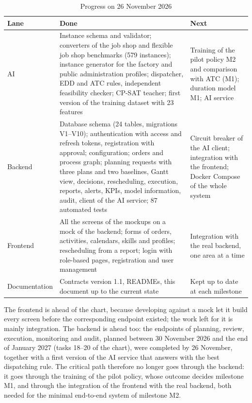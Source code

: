 \begin{table}[htpb]
  \centering
  \small
  \begin{tabular}{@{}p{2.2cm}p{6.1cm}p{5.2cm}@{}}
    \toprule
    \textbf{Lane} & \textbf{Done} & \textbf{Next} \\
    \midrule
    AI & Instance schema and validator; converters of the job shop and flexible job shop
         benchmarks (579 instances); instance generator for the factory and public
         administration profiles; dispatcher, EDD and ATC rules, independent feasibility
         checker; CP-SAT teacher; first version of the training dataset with 23 features &
         Training of the pilot policy M2 and comparison with ATC (M1); duration model M1; AI
         service \\
    \addlinespace
    Backend & Database schema (24 tables, migrations V1--V10); authentication with access
         and refresh tokens, registration with approval; configuration; orders and process
         graph; planning requests with three plans and two baselines, Gantt view, decisions,
         rescheduling, execution, reports, alerts, KPIs, model information, audit, client of
         the AI service; 87 automated tests &
         Circuit breaker of the AI client; integration with the frontend; Docker Compose of the
         whole system \\
    \addlinespace
    Frontend & All the screens of the mockups on a mock of the backend; forms of orders,
         activities, calendars, skills and profiles; rescheduling from a report; login with
         role-based pages, registration and user management &
         Integration with the real backend, one area at a time \\
    \addlinespace
    Documentation & Contracts version 1.1, READMEs, this document up to the current state &
         Kept up to date at each milestone \\
    \bottomrule
  \end{tabular}
  \caption{Progress on 26 November 2026}
  \label{tab:progress}
\end{table}

The frontend is ahead of the chart, because developing against a mock let it build every screen
before the corresponding endpoint existed; the work left for it is mainly integration. The
backend is ahead too: the endpoints of planning, review, execution, monitoring and audit,
planned between 30 November 2026 and the end of January 2027 (tasks 18--20 of the chart), were
completed by 26 November, together with a first version of the AI service that answers with the
best dispatching rule. The critical path therefore no longer goes through the backend: it goes
through the training of the pilot policy, whose outcome decides milestone M1, and through the
integration of the frontend with the real backend, both needed for the minimal end-to-end
system of milestone M2.

